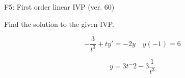\begin{exercise}
  \begin{exerciseTitle}F5: First order linear IVP (ver. 60)\end{exerciseTitle}
  \begin{exerciseStatement}
    
Find the solution to the given IVP.

    
\[-\frac{3}{t^{3}} +ty'= -2 y \hspace{1em} y( -1 ) = 6\]

  \end{exerciseStatement}
  \begin{exerciseAnswer}
    
\[y= 3 t^ -2 -3 \frac{1}{t^{3}}\]

  \end{exerciseAnswer}
\end{exercise}